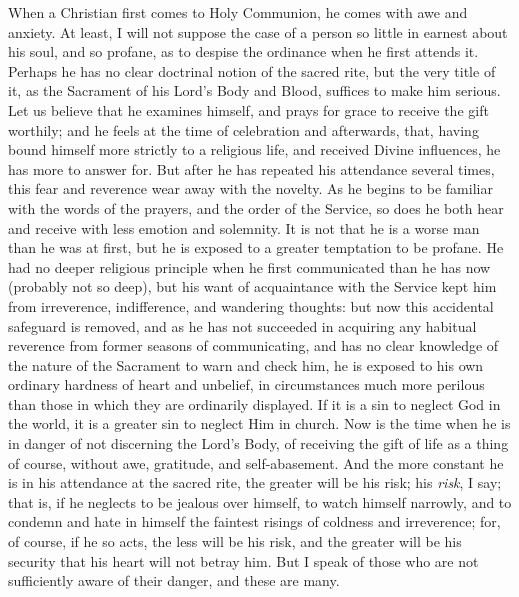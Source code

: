 When a Christian first comes to Holy Communion, he comes with awe
and anxiety. At least, I will not suppose the case of a person so
little in earnest about his soul, and so profane, as to despise the
ordinance when he first attends it. Perhaps he has no clear doctrinal
notion of the sacred rite, but the very title of it, as the Sacrament
of his Lord's Body and Blood, suffices to make him serious. Let us
believe that he examines himself, and prays for grace to receive the
gift worthily; and he feels at the time of celebration and afterwards,
that, having bound himself more strictly to a religious life, and
received Divine influences, he has more to answer for. But after he
has repeated his attendance several times, this fear and reverence
wear away with the novelty. As he begins to be familiar with the words
of the prayers, and the order of the Service, so does he both hear and
receive with less emotion and solemnity. It is not that he is a worse
man than he was at first, but he is exposed to a greater temptation to
be profane. He had no deeper religious principle when he first
communicated than he has now (probably not so deep), but his want of
acquaintance with the Service kept him from irreverence, indifference,
and wandering thoughts: but now this accidental safeguard is removed,
and as he has not succeeded in acquiring any habitual reverence from
former seasons of communicating, and has no clear knowledge of the
nature of the Sacrament to warn and check him, he is exposed to his
own ordinary hardness of heart and unbelief, in circumstances much
more perilous than those in which they are ordinarily displayed. If it
is a sin to neglect God in the world, it is a greater sin to neglect
Him in church. Now is the time when he is in danger of not discerning
the Lord's Body, of receiving the gift of life as a thing of course,
without awe, gratitude, and self-abasement. And the more constant he
is in his attendance at the sacred rite, the greater will be his risk;
his \emph{risk}, I say; that is, if he neglects to be jealous over
himself, to watch himself narrowly, and to condemn and hate in himself
the faintest risings of coldness and irreverence; for, of course, if
he so acts, the less will be his risk, and the greater will be his
security that his heart will not betray him. But I speak of those who
are not sufficiently aware of their danger, and these are many.

